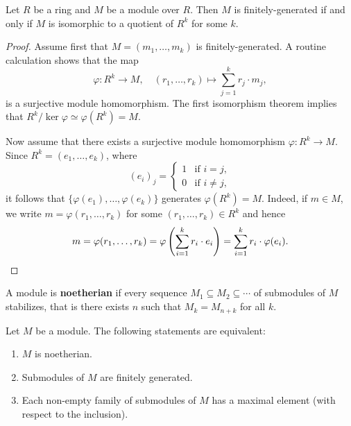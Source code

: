 \begin{proposition}
    Let $R$ be a ring and $M$ be a module over $R$. 
    Then $M$ is finitely-generated if and only 
    if $M$ is isomorphic to a quotient of $R^k$ for some $k$.
\end{proposition}

\begin{proof}
    Assume first that $M=(m_1,\dots,m_k)$ is finitely-generated. A routine calculation shows that
    the map
    \[
    \varphi\colon R^k\to M,\quad
    (r_1,\dots,r_k)\mapsto \sum_{j=1}^kr_j\cdot m_j,
    \]
    is a surjective module homomorphism. The first isomorphism theorem implies that 
    $R^k/\ker\varphi\simeq\varphi(R^k)=M$. 
    
    Now assume that there exists a 
    surjective module homomorphism $\varphi\colon R^k\to M$. Since 
    $R^k=(e_1,\dots,e_k)$, where 
    \[
    (e_i)_j=\begin{cases}
    1 & \text{if $i=j$},\\
    0 & \text{if $i\ne j$},
    \end{cases}
    \]
    it follows that $\{\varphi(e_1),\dots,\varphi(e_k)\}$ generates $\varphi(R^k)=M$. Indeed, 
    if $m\in M$, we write $m=\varphi(r_1,\dots,r_k)$ for some $(r_1,\dots,r_k)\in R^k$ 
    and hence 
    \[
    m=\varphi(r_1,\dots,r_k)=\varphi\left(\sum_{i=1}^k r_i\cdot e_i\right)
    =\sum_{i=1}^kr_i\cdot\varphi(e_i).\qedhere
    \]
\end{proof}

\begin{definition}
A module is \textbf{noetherian} if every sequence $M_1\subseteq M_2\subseteq\cdots$ of submodules of $M$ 
stabilizes, that is there exists $n$ such that $M_k=M_{n+k}$ for all $k$. 	
\end{definition}

\begin{proposition}
Let $M$ be a module. The following statements are equivalent:
\begin{enumerate}
\item $M$ is noetherian.
\item Submodules of $M$ are finitely generated.
\item Each non-empty family of submodules of $M$ has a maximal element (with respect to the inclusion).	
\end{enumerate}
\end{proposition}

